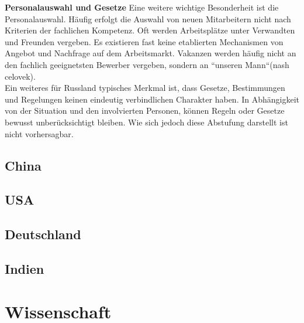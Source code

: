 	\textbf{Personalauswahl und Gesetze}
	 Eine weitere wichtige Besonderheit ist die Personalauswahl. Häufig erfolgt die Auswahl von neuen 
	 Mitarbeitern nicht nach Kriterien der fachlichen Kompetenz. Oft werden Arbeitsplätze unter Verwandten und 
	 Freunden vergeben. Es existieren fast keine etablierten Mechanismen von Angebot und Nachfrage auf dem 
	 Arbeitsmarkt. Vakanzen werden häufig nicht an den fachlich geeignetsten Bewerber vergeben, sondern an 
	 ``unseren Mann``(nash celovek).\\
	 Ein weiteres für Russland typisches Merkmal ist, dass Gesetze, Bestimmungen und 
	 Regelungen keinen eindeutig verbindlichen Charakter haben. In Abhängigkeit von der 
	 Situation und den involvierten Personen, können Regeln oder Gesetze bewusst 
	 unberücksichtigt bleiben. Wie sich jedoch diese Abstufung darstellt ist nicht vorhersagbar. 

	\subsection{China}
	
	
	\subsection{USA}
	
	
	\subsection{Deutschland}
	
	
	\subsection{Indien}


\section{Wissenschaft}